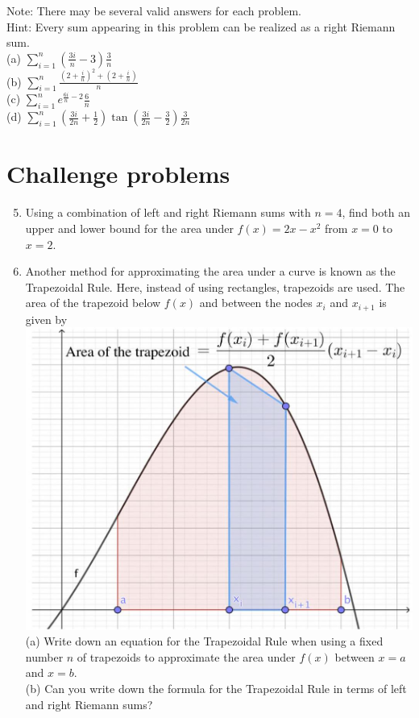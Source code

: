 \documentclass[10pt]{article}
\begin{document}
Note: There may be several valid answers for each problem.\\
Hint: Every sum appearing in this problem can be realized as a right Riemann sum.\\
(a) $\sum_{i=1}^{n}\left(\frac{3 i}{n}-3\right) \frac{3}{n}$\\
(b) $\sum_{i=1}^{n} \frac{\left(2+\frac{i}{n}\right)^{2}+\left(2+\frac{i}{n}\right)}{n}$\\
(c) $\sum_{i=1}^{n} e^{\frac{6 i}{n}-2} \frac{6}{n}$\\
(d) $\sum_{i=1}^{n}\left(\frac{3 i}{2 n}+\frac{1}{2}\right) \tan \left(\frac{3 i}{2 n}-\frac{3}{2}\right) \frac{3}{2 n}$

\section*{Challenge problems}
\begin{enumerate}
  \setcounter{enumi}{4}
  \item Using a combination of left and right Riemann sums with $n=4$, find both an upper and lower bound for the area under $f(x)=2 x-x^{2}$ from $x=0$ to $x=2$.
  \item Another method for approximating the area under a curve is known as the Trapezoidal Rule. Here, instead of using rectangles, trapezoids are used. The area of the trapezoid below $f(x)$ and between the nodes $x_{i}$ and $x_{i+1}$ is given by\\
\includegraphics[max width=\textwidth, center]{2024_12_27_b6d734ff7fda15966c90g-6}\\
(a) Write down an equation for the Trapezoidal Rule when using a fixed number $n$ of trapezoids to approximate the area under $f(x)$ between $x=a$ and $x=b$.\\
(b) Can you write down the formula for the Trapezoidal Rule in terms of left and right Riemann sums?
\end{enumerate}
\end{document}
